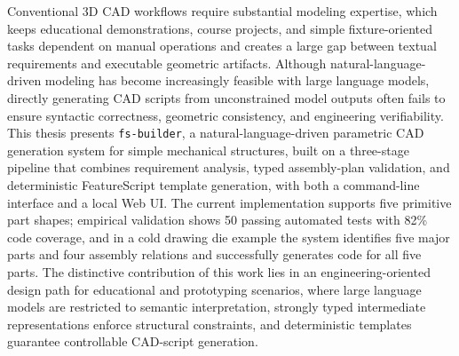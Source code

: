 Conventional 3D CAD workflows require substantial modeling expertise, which keeps educational demonstrations, course projects, and simple fixture-oriented tasks dependent on manual operations and creates a large gap between textual requirements and executable geometric artifacts. Although natural-language-driven modeling has become increasingly feasible with large language models, directly generating CAD scripts from unconstrained model outputs often fails to ensure syntactic correctness, geometric consistency, and engineering verifiability. This thesis presents \texttt{fs-builder}, a natural-language-driven parametric CAD generation system for simple mechanical structures, built on a three-stage pipeline that combines requirement analysis, typed assembly-plan validation, and deterministic FeatureScript template generation, with both a command-line interface and a local Web UI. The current implementation supports five primitive part shapes; empirical validation shows 50 passing automated tests with 82\% code coverage, and in a cold drawing die example the system identifies five major parts and four assembly relations and successfully generates code for all five parts. The distinctive contribution of this work lies in an engineering-oriented design path for educational and prototyping scenarios, where large language models are restricted to semantic interpretation, strongly typed intermediate representations enforce structural constraints, and deterministic templates guarantee controllable CAD-script generation.

